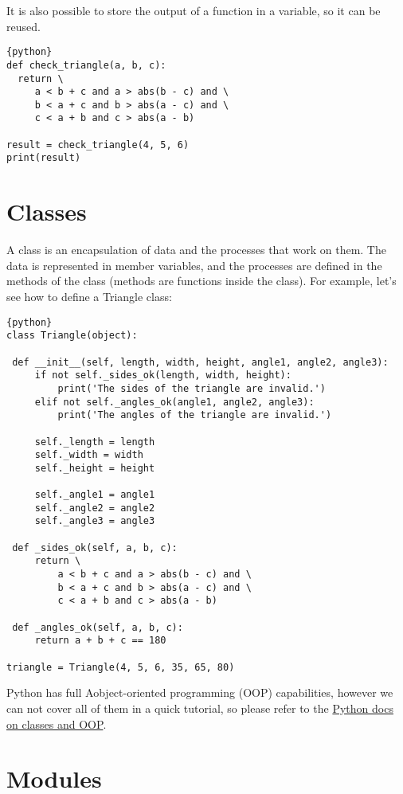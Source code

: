 It is also possible to store the output of a function in a variable, so
it can be reused.

\begin{lstlisting}{python}
def check_triangle(a, b, c):
  return \
     a < b + c and a > abs(b - c) and \
     b < a + c and b > abs(a - c) and \
     c < a + b and c > abs(a - b)

result = check_triangle(4, 5, 6)
print(result)
\end{lstlisting}

\section{Classes}\label{classes}

A class is an encapsulation of data and the processes that work on them.
The data is represented in member variables, and the processes are
defined in the methods of the class (methods are functions inside the
class). For example, let's see how to define a Triangle class:

\begin{lstlisting}{python}
class Triangle(object):

 def __init__(self, length, width, height, angle1, angle2, angle3):
     if not self._sides_ok(length, width, height):
         print('The sides of the triangle are invalid.')
     elif not self._angles_ok(angle1, angle2, angle3):
         print('The angles of the triangle are invalid.')

     self._length = length
     self._width = width
     self._height = height

     self._angle1 = angle1
     self._angle2 = angle2
     self._angle3 = angle3

 def _sides_ok(self, a, b, c):
     return \
         a < b + c and a > abs(b - c) and \
         b < a + c and b > abs(a - c) and \
         c < a + b and c > abs(a - b)

 def _angles_ok(self, a, b, c):
     return a + b + c == 180

triangle = Triangle(4, 5, 6, 35, 65, 80)
\end{lstlisting}

Python has full Aobject-oriented programming (OOP) capabilities, however
we can not cover all of them in a quick tutorial, so please refer to the
\href{https://docs.python.org/2.7/tutorial/classes.html}{Python docs on
classes and OOP}.

\section{Modules}\label{modules}

